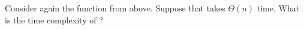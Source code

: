 \begin{prob}
    Consider again the  function from above. Suppose that 
    takes $\Theta(n)$ time. What is the time complexity of ?

\end{prob}
